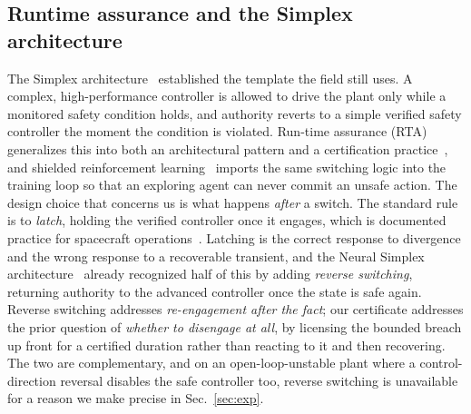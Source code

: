 \documentclass[11pt]{article}
\theoremstyle{plain}
\theoremstyle{definition}
\begin{document}
\subsection{Runtime assurance and the Simplex architecture} The Simplex
architecture~\cite{Sha2001} established the template the field still uses. A complex,
high-performance controller is allowed to drive the plant only while a monitored safety
condition holds, and authority reverts to a simple verified safety controller the moment the
condition is violated. Run-time assurance (RTA) generalizes this into both an architectural
pattern and a certification practice~\cite{Hook2016,ASTMF3269}, and shielded reinforcement
learning~\cite{Alshiekh2018} imports the same switching logic into the training loop so that
an exploring agent can never commit an unsafe action. The design choice that concerns us is
what happens \emph{after} a switch. The standard rule is to \emph{latch}, holding the
verified controller once it engages, which is documented practice for spacecraft
operations~\cite{Dunlap2022}. Latching is the correct response to divergence and the wrong
response to a recoverable transient, and the Neural Simplex architecture~\cite{Phan2020}
already recognized half of this by adding \emph{reverse switching}, returning authority to
the advanced controller once the state is safe again. Reverse switching addresses
\emph{re-engagement after the fact}; our certificate addresses the prior question of
\emph{whether to disengage at all}, by licensing the bounded breach up front for a certified
duration rather than reacting to it and then recovering. The two are complementary, and on an
open-loop-unstable plant where a control-direction reversal disables the safe controller too,
reverse switching is unavailable for a reason we make precise in Sec.~\ref{sec:exp}.
\end{document}
